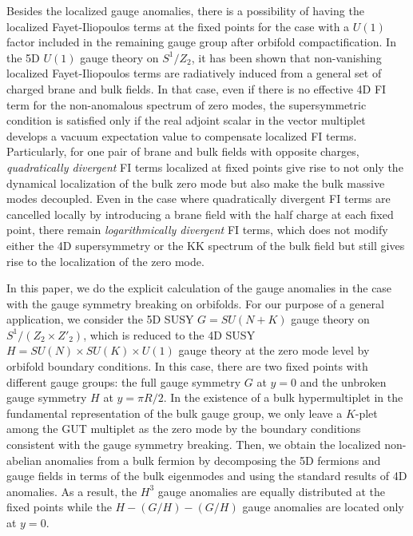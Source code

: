 \documentclass[a4paper,12pt]{article}
\begin{document}
Besides the localized gauge anomalies,
there is a possibility of having the localized Fayet-Iliopoulos terms
at the fixed points for the case with a $U(1)$ factor
included in the remaining gauge group after orbifold 
compactification\cite{nilles2,barbieri,nilles,pomarol}.
In the 5D $U(1)$ gauge theory on $S^1/Z_2$,
it has been shown that non-vanishing
localized Fayet-Iliopoulos terms are radiatively induced from a general set of
charged brane and bulk fields\cite{nilles}. 
In that case, even if there is no effective 4D
FI term for the non-anomalous spectrum of zero modes,
the supersymmetric condition is satisfied
only if the real adjoint scalar in the vector multiplet develops
a vacuum expectation value to compensate 
localized FI terms\cite{peskin,ah2,barbieri,nilles,pomarol}.
Particularly, for one pair of brane and bulk fields with opposite charges,
{\it quadratically divergent} FI terms localized at fixed points
give rise to not only
the dynamical localization of the bulk zero mode 
but also make the bulk massive modes decoupled. 
Even in the case
where quadratically divergent FI terms are cancelled locally
by introducing a brane field with the half charge 
at each fixed point, there remain
{\it logarithmically divergent} FI terms,
which does not modify either
the 4D supersymmetry or the KK spectrum of the bulk field
but still gives rise to the localization of the zero mode\cite{nilles}.

In this paper, we do the explicit calculation of the gauge anomalies 
in the case with the gauge symmetry breaking on orbifolds. 
For our purpose of a general application, 
we consider the 5D SUSY $G=SU(N+K)$ gauge theory on $S^1/(Z_2\times Z'_2)$, 
which is reduced to 
the 4D SUSY $H=SU(N)\times SU(K)\times U(1)$ gauge theory at the zero mode 
level by orbifold boundary conditions. 
In this case, there are two fixed points with different gauge groups: the full
gauge symmetry $G$ at $y=0$ and the unbroken gauge symmetry $H$ at $y=\pi R/2$. 
In the existence of a bulk hypermultiplet
in the fundamental representation of the bulk gauge group, 
we only leave a $K$-plet among the GUT multiplet as the zero mode by 
the boundary conditions consistent with the gauge symmetry breaking. 
Then, we obtain the localized non-abelian anomalies from a bulk fermion 
by decomposing the 5D fermions and gauge fields in terms of the bulk eigenmodes 
and using the standard results of 4D anomalies. 
As a result, the $H^3$ gauge anomalies are equally distributed 
at the fixed points while the $H-(G/H)-(G/H)$ gauge anomalies 
are located only at $y=0$. 
\end{document}
